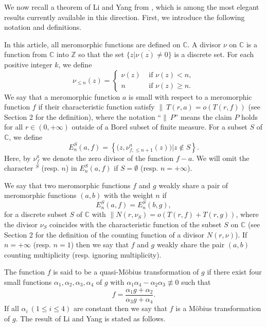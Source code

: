 \documentclass[12pt,leqno]{amsart}
\newcommand{\C}{{\mathbb{C}}}
\newcommand{\Z}{\mathbb{Z}}
\numberwithin{equation}{section}
\begin{document}
We now recall a theorem of Li and Yang from \cite{LY2}, which is among the most elegant results currently available in this direction. First, we introduce the following notation and definitions.

In this article, all meromorphic functions are defined on $\mathbb{C}$. A divisor $\nu$ on $\C$ is a function from $\C$ into $\Z$ so that the set $\overline{\{z|\nu(z)\ne 0\}}$ is a discrete set. For each positive integer $k$, we define
$$ \nu_{\le n}(z)=\begin{cases}
\nu (z)&\text{ if }\nu(z)< n,\\
n&\text{ if }\nu(z)\ge n. 
\end{cases} $$
We say that a meromorphic function $a$ is small with respect to a meromorphic function $f$ if their characteristic function satisfy $\|\ T(r,a)=o(T(r,f))$ (see Section 2 for the definition), where the notation ``$\|\ P$'' means the claim $P$ holds for all $r\in (0,+\infty)$ outside of a Borel subset of finite measure.  For a subset $S$ of $\C$, we define 
$$E^{S}_{n}(a,f)=\left\{\bigl (z,\nu^a_{f,\le n+1}(z)\bigl)\bigl |z\not\in S\right\}.$$
Here, by $\nu^a_{f}$ we denote the zero divisor of the function $f-a$. We will omit the character $^{S}$ (resp. $n$) in $E^{S}_{n}(a,f)$ if $S=\emptyset$ (resp. $n=+\infty$).

We say that two meromorphic functions $f$ and $g$ weakly share a pair of meromorphic functions $(a,b)$ with the weight $n$ if 
$$E^{S}_n(a,f)=E^{S}_n(b,g),$$
for a discrete subset $S$ of $\C$ with $\| N(r,\nu_S)=o(T(r,f)+T(r,g))$, where the divisor $\nu_S$ coincides with the characteristic function of the subset $S$ on $\C$ (see Section 2 for the definition of the counting function of a divisor $N(r,\nu)$). If $n=+\infty$ (resp. $n=1$) then we say that $f$ and $g$ weakly share the pair $(a,b)$ counting multiplicity (resp. ignoring multiplicity).


The function $f$ is said to be a quasi-M\"{o}bius transformation of $g$ if there exist four small functions $\alpha_1, \alpha_2, \alpha_3, \alpha_4$ of $g$ with $\alpha_1\alpha_4-\alpha_2\alpha_3\not\equiv 0$ such that 
$$f=\dfrac{\alpha_1g+\alpha_2}{\alpha_3g+\alpha_4}.$$ 
If all $\alpha_i\ (1\le i\le 4)$ are constant then we say that $f$ is a M\"{o}bius transformation of $g$. The result of Li and Yang is stated as follows.
\end{document}
